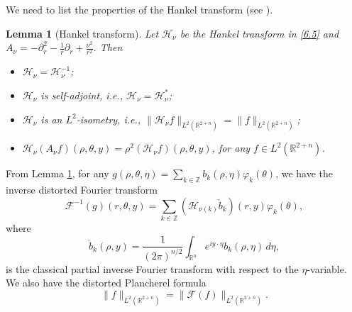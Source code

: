\documentclass[a4paper,11pt, reqno]{amsart}
\numberwithin{equation}{section}
\theoremstyle{plain}
\newtheorem{lemma}[theorem]{Lemma}
\theoremstyle{definition}
\theoremstyle{remark}
\begin{document}
We need to list the properties of the Hankel transform (see \cite{burq2003}).
\begin{lemma}[Hankel transform]\label{L6.1}
 Let $\mathcal{H}_\nu$ be the Hankel transform in \eqref{6.5} and $A_\nu =-\partial_r^2 - \frac{1}{r}\partial_r + \frac{\nu^2}{r^2}$. Then
\begin{itemize}
\item[(1)] $\mathcal{H}_{\nu} = \mathcal{H}_{\nu}^{-1}$;
\item[(2)] $\mathcal{H}_{\nu}$ is self-adjoint, i.e.,  $\mathcal{H}_{\nu} = \mathcal{H}_{\nu}^{*}$;
\item[(3)] $\mathcal{H}_{\nu}$ is an $L^2$-isometry, i.e., $\| \mathcal{H}_{\nu} f \|_{L^2(\mathbb{R}^{2+n})} = \| f \|_{L^2(\mathbb{R}^{2+n})}$;
\item[(4)] $\mathcal{H}_{\nu}(A_{\nu}f)(\rho,\theta,y) = \rho^2(\mathcal{H}_{\nu}f)(\rho,\theta,y)$, for any $f \in L^2(\mathbb{R}^{2+n})$.
\end{itemize}
\end{lemma}
\noindent From Lemma \ref{L6.1}, for any $g(\rho, \theta, \eta) = \sum\limits_{k \in \mathbb{Z}} b_k(\rho, \eta) \varphi_k(\theta)$, we have the inverse distorted Fourier transform
\begin{equation}
	\mathcal{F}^{-1}(g)(r, \theta, y) = \sum_{k \in \mathbb{Z}} \left( \mathcal{H}_{\nu(k)} \check{b}_k \right)(r, y) \varphi_k(\theta),
\end{equation}
where 
\begin{equation*}
\check{b}_k(\rho, y) =\frac{1}{(2\pi)^{n/2}} \int_{\mathbb{R}^n} e^{iy \cdot \eta} b_k(\rho,\eta) \, d\eta,
\end{equation*}
is the classical partial inverse Fourier transform with respect to the $\eta$-variable. We also have the distorted Plancherel formula
\begin{equation}\label{Plancherel}
\|f\|_{L^2(\mathbb{R}^{2+n})}=\|\mathcal{F}(f)\|_{L^2(\mathbb{R}^{2+n})}. 
\end{equation}
\end{document}
